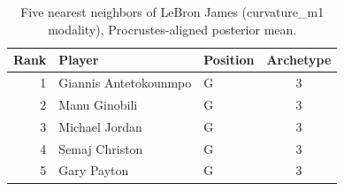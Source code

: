 \begin{table}[htbp]
  \centering\small
  \begin{tabular}{rllc}
    \toprule
    Rank & Player & Position & Archetype \\
    \midrule
    1 & Giannis Antetokounmpo & G & 3 \\
    2 & Manu Ginobili & G & 3 \\
    3 & Michael Jordan & G & 3 \\
    4 & Semaj Christon & G & 3 \\
    5 & Gary Payton & G & 3 \\
    \bottomrule
  \end{tabular}
  \caption{Five nearest neighbors of LeBron James (curvature_m1 modality), Procrustes-aligned posterior mean.}
  \label{tab:LeBron_James_neighbors_curvature_m1}
\end{table}


